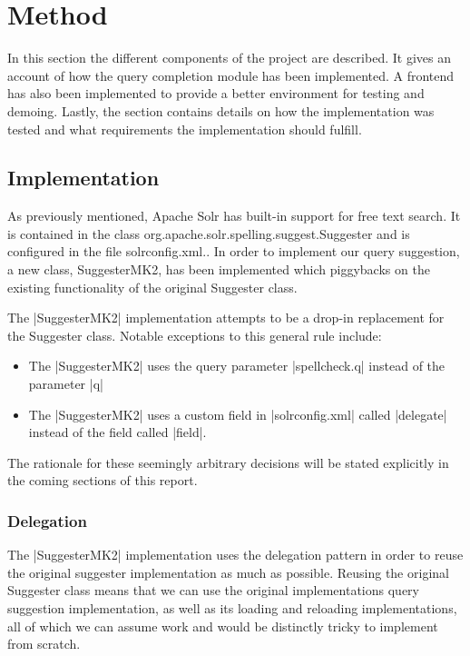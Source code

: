 \section{Method}\label{method}

In this section the different components of the project are described. It gives an account of how the query completion module has been implemented. A frontend has also been implemented to provide a better environment for testing and demoing. Lastly, the section contains details on how the implementation was tested and what requirements the implementation should fulfill. 

\subsection{Implementation}

As previously mentioned, Apache Solr has built-in support for free text search. It is contained in the class org.apache.solr.spelling.suggest.Suggester and is configured in the file solrconfig.xml.. In order to implement our query suggestion, a new class, SuggesterMK2, has been implemented which piggybacks on the existing functionality of the original Suggester class.\cite{SUGGESTER}

The |SuggesterMK2| implementation attempts to be a drop-in replacement for the Suggester class. Notable exceptions to this general rule include:
\begin{itemize}

\item The |SuggesterMK2| uses the query parameter |spellcheck.q| instead of the parameter |q|
\item The |SuggesterMK2| uses a custom field in |solrconfig.xml| called |delegate| instead of the field called |field|.
\end{itemize}

The rationale for these seemingly arbitrary decisions will be stated explicitly in the coming sections of this report.

\subsubsection{Delegation}

The |SuggesterMK2| implementation uses the delegation pattern\cite{DELEGATE} in order to reuse the original suggester implementation as much as possible. Reusing the original Suggester class means that we can use the original implementations query suggestion implementation, as well as its loading and reloading implementations, all of which we can assume work and would be distinctly tricky to implement from scratch.

